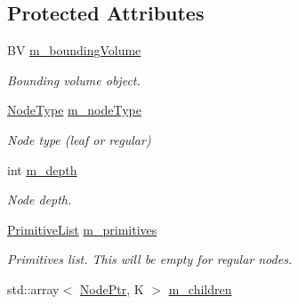 \subsection*{Protected Attributes}
\begin{DoxyCompactItemize}
\item 
\mbox{\label{classBVH_1_1NodeT_a7f8720f2ab03ee9e81de114c479cb2e5}} 
BV \hyperlink{classBVH_1_1NodeT_a7f8720f2ab03ee9e81de114c479cb2e5}{m\+\_\+bounding\+Volume}
\begin{DoxyCompactList}\small\item\em Bounding volume object. \end{DoxyCompactList}\item 
\mbox{\label{classBVH_1_1NodeT_a1e8922fc8cfca32763a7fcb85d9a9508}} 
\hyperlink{namespaceBVH_a7613f83a60cfae9aba31861110bd9e54}{Node\+Type} \hyperlink{classBVH_1_1NodeT_a1e8922fc8cfca32763a7fcb85d9a9508}{m\+\_\+node\+Type}
\begin{DoxyCompactList}\small\item\em Node type (leaf or regular) \end{DoxyCompactList}\item 
\mbox{\label{classBVH_1_1NodeT_a8b924aa0aa13630167f69a7b19038e7e}} 
int \hyperlink{classBVH_1_1NodeT_a8b924aa0aa13630167f69a7b19038e7e}{m\+\_\+depth}
\begin{DoxyCompactList}\small\item\em Node depth. \end{DoxyCompactList}\item 
\mbox{\label{classBVH_1_1NodeT_abcdc79254bc8b9d227a70e1ad15ff35e}} 
\hyperlink{classBVH_1_1NodeT_a19cce6e7fbe85eccb4a3718dd69f49b7}{Primitive\+List} \hyperlink{classBVH_1_1NodeT_abcdc79254bc8b9d227a70e1ad15ff35e}{m\+\_\+primitives}
\begin{DoxyCompactList}\small\item\em Primitives list. This will be empty for regular nodes. \end{DoxyCompactList}\item 
\mbox{\label{classBVH_1_1NodeT_a35da0576176a01c9c441f0f2b899ca33}} 
std\+::array$<$ \hyperlink{classBVH_1_1NodeT_a008f5c2c53adb1f5730d8478b48529b1}{Node\+Ptr}, K $>$ \hyperlink{classBVH_1_1NodeT_a35da0576176a01c9c441f0f2b899ca33}{m\+\_\+children}

\end{DoxyCompactItemize}

